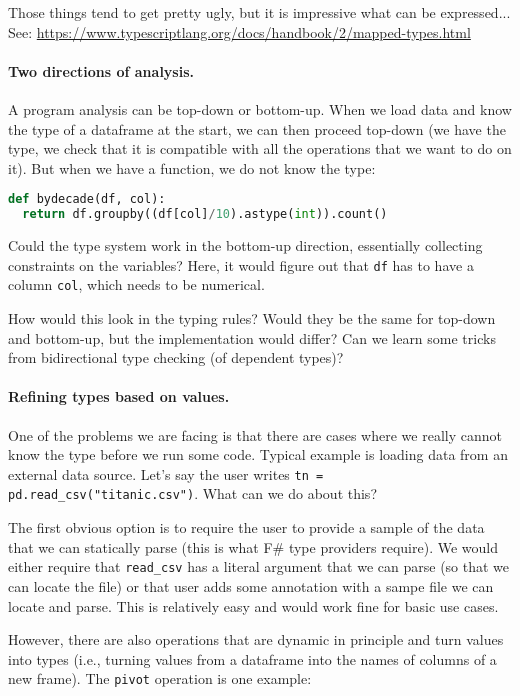 \documentclass{article}
\begin{document}
Those things tend to get pretty ugly, but it is impressive what can be expressed...
See: \url{https://www.typescriptlang.org/docs/handbook/2/mapped-types.html}

\vspace{-0.3em}
\paragraph{Two directions of analysis.}
A program analysis can be top-down or bottom-up. When we load data and know the type of a dataframe at the start, we can then proceed top-down (we have the type, we check that it is compatible with all the operations that we want to do on it). But when we have a function, we do not know the type:

\begin{lstlisting}[language=Python]
def bydecade(df, col):
  return df.groupby((df[col]/10).astype(int)).count()
\end{lstlisting}

Could the type system work in the bottom-up direction, essentially collecting constraints on the variables? Here, it would figure out that \texttt{df} has to have a column \texttt{col}, which needs to be numerical.

How would this look in the typing rules? Would they be the same for top-down and bottom-up, but the implementation would differ? Can we learn some tricks from bidirectional type checking (of dependent types)?

\vspace{-0.3em}
\paragraph{Refining types based on values.}
One of the problems we are facing is that there are cases where we really cannot know the type before we run some code. Typical example is loading data from an external data source. Let's say
the user writes \texttt{tn = pd.read\_csv("titanic.csv")}. What can we do about this?

The first obvious option is to require the user to provide a sample of the data that we can
statically parse (this is what F\# type providers require). We would either require that
\texttt{read\_csv} has a literal argument that we can parse (so that we can locate the file)
or that user adds some annotation with a sampe file we can locate and parse. This is relatively
easy and would work fine for basic use cases.

However, there are also operations that are dynamic in principle and turn values into types
(i.e., turning values from a dataframe into the names of columns of a new frame). The
\texttt{pivot} operation is one example:
\end{document}
